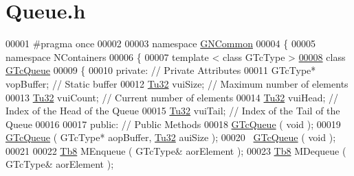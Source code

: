 \hypertarget{_queue_8h_source}{}\section{Queue.\+h}
\label{_queue_8h_source}

\begin{DoxyCode}
00001 \textcolor{preprocessor}{#pragma once}
00002 
00003 \textcolor{keyword}{namespace }\mbox{\hyperlink{namespace_g_n_common}{GNCommon}}
00004 \{
00005    \textcolor{keyword}{namespace }NContainers
00006    \{
00007       \textcolor{keyword}{template} < \textcolor{keyword}{class} GTcType >
\mbox{\hyperlink{class_g_n_common_1_1_n_containers_1_1_g_tc_queue}{00008}}       \textcolor{keyword}{class }\mbox{\hyperlink{class_g_n_common_1_1_n_containers_1_1_g_tc_queue}{GTcQueue}}
00009       \{
00010       \textcolor{keyword}{private}:       \textcolor{comment}{// Private Attributes}
00011          GTcType* vopBuffer; \textcolor{comment}{// Static buffer }
00012          \mbox{\hyperlink{namespace_g_n_common_a941b527ef318f318aed7903dc832b7e4}{Tu32}}    vuiSize;   \textcolor{comment}{// Maximum number of elements}
00013          \mbox{\hyperlink{namespace_g_n_common_a941b527ef318f318aed7903dc832b7e4}{Tu32}}    vuiCount;  \textcolor{comment}{// Current number of elements}
00014          \mbox{\hyperlink{namespace_g_n_common_a941b527ef318f318aed7903dc832b7e4}{Tu32}}    vuiHead;   \textcolor{comment}{// Index of the Head of the Queue}
00015          \mbox{\hyperlink{namespace_g_n_common_a941b527ef318f318aed7903dc832b7e4}{Tu32}}    vuiTail;   \textcolor{comment}{// Index of the Tail of the Queue}
00016 
00017       \textcolor{keyword}{public}:        \textcolor{comment}{// Public Methods}
00018          \mbox{\hyperlink{class_g_n_common_1_1_n_containers_1_1_g_tc_queue}{GTcQueue}}  ( \textcolor{keywordtype}{void} );
00019          \mbox{\hyperlink{class_g_n_common_1_1_n_containers_1_1_g_tc_queue}{GTcQueue}}  ( GTcType* aopBuffer, \mbox{\hyperlink{namespace_g_n_common_a941b527ef318f318aed7903dc832b7e4}{Tu32}} auiSize );
00020          ~\mbox{\hyperlink{class_g_n_common_1_1_n_containers_1_1_g_tc_queue}{GTcQueue}} ( \textcolor{keywordtype}{void} );
00021 
00022          \mbox{\hyperlink{namespace_g_n_common_a8115dc7ed53b6e5b52e6bfde1632ea74}{Tb8}}  MEnqueue ( GTcType& aorElement );
00023          \mbox{\hyperlink{namespace_g_n_common_a8115dc7ed53b6e5b52e6bfde1632ea74}{Tb8}}  MDequeue ( GTcType& aorElement );

\end{DoxyCode}
